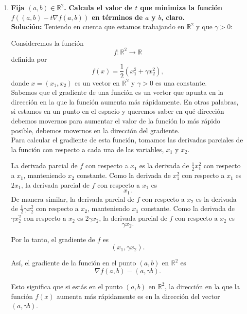 \begin{enumerate}
\begin{enumerate}[\bfseries (a)]
	\item \textbf{\boldmath Fija $(a,b)\in \mathbb{R}^2$. Calcula el valor de $t$ que minimiza la función $f\left((a,b)-t\nabla f(a,b)\right)$ en términos de $a$ y $b$, claro.}\\ 

	    \textbf{Solución:} Teniendo en cuenta que estamos trabajando en $\mathbb{R}^2$ y que $\gamma > 0$:

	    Consideremos la función $$f: \mathbb{R}^2 \rightarrow \mathbb{R}$$ definida por $$f(x) = \frac{1}{2}(x_1^2 + \gamma x_2^2),$$ donde $x = (x_1, x_2)$ es un vector en $\mathbb{R}^2$ y $\gamma > 0$ es una constante.\\

	    Sabemos que el gradiente de una función es un vector que apunta en la dirección en la que la función aumenta más rápidamente. En otras palabras, si estamos en un punto en el espacio y queremos saber en qué dirección debemos movernos para aumentar el valor de la función lo más rápido posible, debemos movernos en la dirección del gradiente.\\

	    Para calcular el gradiente de esta función, tomamos las derivadas parciales de la función con respecto a cada una de las variables, $x_1$ y $x_2$. 

	    La derivada parcial de $f$ con respecto a $x_1$ es la derivada de $\frac{1}{2}x_1^2$ con respecto a $x_1$, manteniendo $x_2$ constante. Como la derivada de $x_1^2$ con respecto a $x_1$ es $2x_1$, la derivada parcial de $f$ con respecto a $x_1$ es 
	    $$x_1.$$ 
	    De manera similar, la derivada parcial de $f$ con respecto a $x_2$ es la derivada de $\frac{1}{2}\gamma x_2^2$ con respecto a $x_2$, manteniendo $x_1$ constante. Como la derivada de $\gamma x_2^2$ con respecto a $x_2$ es $2\gamma x_2$, la derivada parcial de $f$ con respecto a $x_2$ es 
	    $$\gamma x_2.$$

	    Por lo tanto, el gradiente de $f$ es 
	    $$(x_1, \gamma x_2).$$

	    Así, el gradiente de la función en el punto $(a,b)$ en $\mathbb{R}^2$ es 
	    $$\nabla f(a,b) = (a, \gamma b).$$

	    Esto significa que si estás en el punto $(a,b)$ en $\mathbb{R}^2$, la dirección en la que la función $f(x)$ aumenta más rápidamente es en la dirección del vector $(a, \gamma b)$.\\


\end{enumerate}
\end{enumerate}
